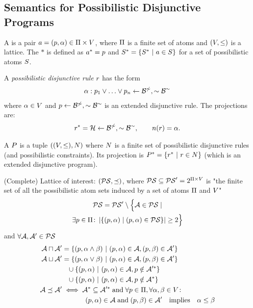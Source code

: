 \subsection{Semantics for Possibilistic Disjunctive Programs \protect\cite{Nieves2007possibilisitc}}

A  is a pair $\patom = (\atom, \lelem)\in\Atoms\times\lset$, where $\Atoms$ is a finite set of atoms and $(\lset, \leq)$ is a lattice.
The  $*$ is defined as $\proj = \atom$ and $S^{*} = \set{\proj[\pAtoms] \guard \patom\in\pAtoms}$ for a set of possibilistic atoms $\pAtoms$.

A \emph{possibilistic disjunctive rule} $\prule$ has the form
\[
    \lelem : \atom_1\flpor\dots\flpor\atom_n \lpif \pbody, \flpnot\;\nbody
\]
where $\lelem\in\lset$ and $\atom \lpif \pbody, \flpnot\;\nbody$ is an
extended disjunctive rule. The projections are:
\[
    \proj[\prule] = \head \lpif \pbody, \flpnot\;\nbody, \qquad
    \projrule  = \lelem.
\]

A  $\pflp$ is a tuple $\tuple{(\lset,\leq),\pRules}$ where $\pRules$ is a finite set of possibilistic disjunctive rules (and possibilistic constraints).
Its projection is $\proj[\pflp] = \set{ \proj[\prule] \guard \prule\in\pRules }$ (which is an extended disjunctive program).

(Complete) Lattice of interest: $(\Pint,\possleq)$, where $\Pint\subseteq\Pint'=\pset{\Atoms\times\lset}$ is "the finite set of all the possibilistic atom sets induced by a set of atoms $\Atoms$ and $\lset$"
\begin{multline*}
    \Pint = \Pint'\setminus\Bigl\{\pint\in\Pint\mid\\
    \exists\atom\in\Atoms\colon\card{\set{(\atom,\lelem)\mid (\atom,\lelem)\in\Pint}}\geq2\Bigr\}
\end{multline*}
and $\forall \pint,\pintalt\in\Pint$
\begingroup\small
\begin{align*}
    \pint\possglb\pintalt  & = \set{(\atom,\lelem\glb\lelemalt)\guard (\atom,\lelem)\in\pint, (\atom,\lelemalt)\in\pintalt}                    \\
    \pint\posslub\pintalt  & = \set{(\atom,\lelem\lub\lelemalt)\guard (\atom,\lelem)\in\pint, (\atom,\lelemalt)\in\pintalt}                    \\
                           & \phantom{=}\cup \set{(\atom,\lelem)\guard (\atom,\lelem)\in\pint, \atom\notin\proj[\pintalt]}                    \\
                           & \phantom{=}\cup \set{(\atom,\lelem)\guard (\atom,\lelem)\in\pint, \atom\notin\proj[\pint]}                       \\
    \pint \possleq \pintalt & \iff \proj[\pint] \subseteq \proj[\pintalt] \tand \forall \atom\in\Atoms,\forall\lelem,\lelemalt\in\lset\colon     \\
                           & \phantom{\iff}\quad (\atom,\lelem)\in\pint \tand (\atom,\lelemalt)\in\pintalt\timplies \lelem\leq\lelemalt
\end{align*}
\endgroup

